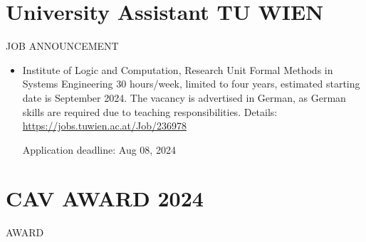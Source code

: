 \documentclass[prodmode,acmtecs]{acmsmall} %
\begin{document}
\begin{itemize}
\end{itemize}\section{University Assistant TU WIEN}\label{UniversityAssistantTUWIEN}JOB ANNOUNCEMENT 

\begin{itemize}\item  Institute of Logic and Computation, Research Unit Formal Methods in Systems Engineering 30 hours/week, limited to four years, estimated starting date is September 2024. The vacancy is advertised in German, as German skills are required due to teaching responsibilities. Details: \href{https://jobs.tuwien.ac.at/Job/236978}{https://jobs.tuwien.ac.at/Job/236978} 
 
Application deadline: Aug 08, 2024 
 
\end{itemize}\section{CAV AWARD 2024}\label{CAVAWARD2024}AWARD 
\end{document}
